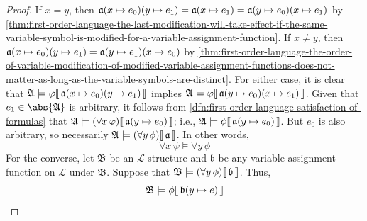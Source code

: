 \begin{proof}
    \vspace{0.3cm}
    \noindent
    If \( x = y \), then \( \folmodifiedvariableassignmentfunction{ \folmodifiedvariableassignmentfunction{\mathfrak{a}}{x}{e_{0}} }{y}{e_{1}} =
    \folmodifiedvariableassignmentfunction{\mathfrak{a}}{x}{e_{1}} = \folmodifiedvariableassignmentfunction{ \folmodifiedvariableassignmentfunction{\mathfrak{a}}{y}{e_{0}} }{x}{e_{1}} \) by \cref{thm:first-order-language-the-last-modification-will-take-effect-if-the-same-variable-symbol-is-modified-for-a-variable-assignment-function}.
    If \( x \neq y \),
    then \( \folmodifiedvariableassignmentfunction{ \folmodifiedvariableassignmentfunction{\mathfrak{a}}{x}{e_{0}} }{y}{e_{1}}
    = \folmodifiedvariableassignmentfunction{ \folmodifiedvariableassignmentfunction{\mathfrak{a}}{y}{e_{1}} }{x}{e_{0}} \) by
    \cref{thm:first-order-language-the-order-of-variable-modification-of-modified-variable-assignment-functions-does-not-matter-as-long-as-the-variable-symbols-are-distinct}.
    For either case, it is clear that
    \( \folwffsatisfaction{\mathfrak{A}}{\varphi}{ \folmodifiedvariableassignmentfunction{ \folmodifiedvariableassignmentfunction{\mathfrak{a}}{x}{e_{0}} }{y}{e_{1}} } \)
    implies
    \( \folwffsatisfaction{\mathfrak{A}}{\varphi}{ \folmodifiedvariableassignmentfunction{ \folmodifiedvariableassignmentfunction{\mathfrak{a}}{y}{e_{0}} }{x}{e_{1}} } \).
    Given that \( e_{1} \in \abs{\mathfrak{A}} \) is arbitrary,
    it follows from \cref{dfn:first-order-language-satisfaction-of-formulas} that
    \( \folwffsatisfaction{\mathfrak{A}}{ \mleft( \forall x \, \varphi \mright) }{ \folmodifiedvariableassignmentfunction{\mathfrak{a}}{y}{e_{0}} } \);
    i.e., \( \folwffsatisfaction{\mathfrak{A}}{\phi}{ \folmodifiedvariableassignmentfunction{\mathfrak{a}}{y}{e_{0}} } \). But \( e_{0} \) is also arbitrary,
    so necessarily \( \folwffsatisfaction{\mathfrak{A}}{ \mleft( \forall y \, \phi \mright) }{\mathfrak{a}} \).
    In other words,
    \begin{equation*}
        \forall x \, \psi \models \forall y \, \phi
    \end{equation*}
    For the converse, let \( \mathfrak{B} \) be an \( \mathcal{L} \)-structure and \( \mathfrak{b} \) be any variable assignment function
    on \( \mathcal{L} \) under \( \mathfrak{B} \). Suppose that \( \folwffsatisfaction{\mathfrak{B}}{\mleft( \forall y \, \phi \mright)}{\mathfrak{b}} \).
    Thus,
    \begin{equation}
        \label{eq:forall-y-phi-is-satisfied-with-b}
        \folwffsatisfaction{\mathfrak{B}}{\phi}{ \folmodifiedvariableassignmentfunction{\mathfrak{b}}{y}{e} }

\end{equation}
\end{proof}
